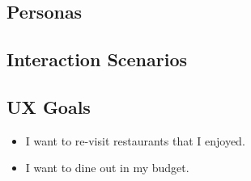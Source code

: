 \documentclass[a4 paper, 12pt]{article}
\begin{document}
    \subsection{Personas}
    \subsection{Interaction Scenarios}
    \subsection{UX Goals}
        \begin{itemize}
            \item I want to re-visit restaurants that I enjoyed.
            \item I want to dine out in my budget.
        \end{itemize}
\end{document}
